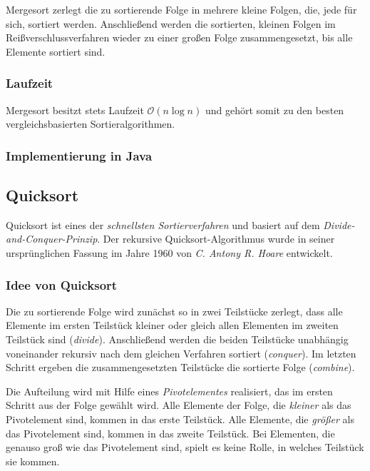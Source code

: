 \documentclass[german]{pfBook}
\newcommand{\OO}{\mathcal{O}}
\begin{document}
	Mergesort zerlegt die zu sortierende Folge in mehrere kleine Folgen, die, jede für sich, sortiert werden. Anschließend werden die sortierten, kleinen Folgen im Reißverschlussverfahren wieder zu einer großen Folge zusammengesetzt, bis alle Elemente sortiert sind.
	
	\subsubsection{Laufzeit}
	
	Mergesort besitzt stets Laufzeit $\OO(n \log n)$ und gehört somit zu den besten vergleichsbasierten Sortieralgorithmen.
	
	\subsubsection{Implementierung in Java}
	
	
	
	\subsection{Quicksort}
	
	Quicksort ist eines der \emph{schnellsten Sortierverfahren} und basiert auf dem \emph{Divide-and-Conquer-Prinzip}. Der rekursive Quicksort-Algorithmus wurde in seiner ursprünglichen Fassung im Jahre 1960 von \emph{C. Antony R. Hoare} entwickelt.
	
	\subsubsection{Idee von Quicksort}
	
	Die zu sortierende Folge wird zunächst so in zwei Teilstücke zerlegt, dass alle Elemente im ersten Teilstück kleiner oder gleich allen Elementen im zweiten Teilstück sind (\emph{divide}). Anschließend werden die beiden Teilstücke unabhängig voneinander rekursiv nach dem gleichen Verfahren sortiert (\emph{conquer}). Im letzten Schritt ergeben die zusammengesetzten Teilstücke die sortierte Folge (\emph{combine}).
	
	Die Aufteilung wird mit Hilfe eines \emph{Pivotelementes} realisiert, das im ersten Schritt aus der Folge gewählt wird. Alle Elemente der Folge, die \emph{kleiner} als das Pivotelement sind, kommen in das erste Teilstück. Alle Elemente, die \emph{größer} als das Pivotelement sind, kommen in das zweite Teilstück. Bei Elementen, die genauso groß wie das Pivotelement sind, spielt es keine Rolle, in welches Teilstück sie kommen.
	
\end{document}
